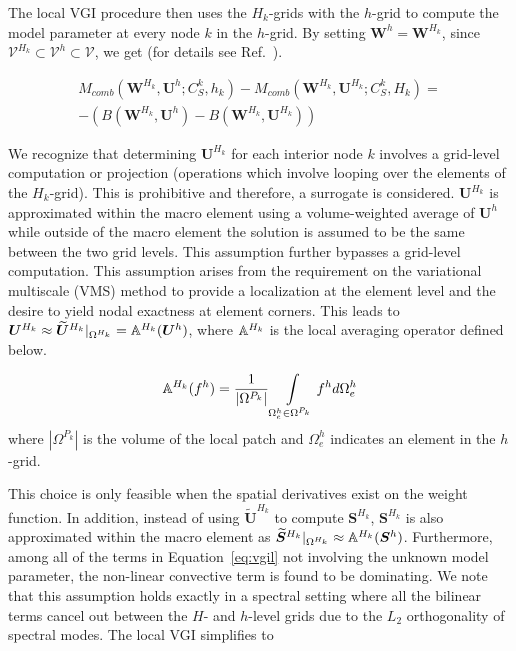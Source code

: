 The local VGI procedure then uses the
$H_k$-grids with the $h$-grid to compute the model
parameter at every node $k$ in the $h$-grid.
By setting $\bm{W}^h = \bm{W}^{H_k}$,
since $\bm{\mathcal{V}}^{H_k} \subset \bm{\mathcal{V}}^h \subset \bm{\mathcal{V}}$,
we get (for details see Ref.~\cite{bib:tran2017b}).

\begin{equation}
\label{eq:vgil}
\begin{split}
 M_{comb}(\bm{W}^{H_k},\bm{U}^h; C^k_S, h_k) - M_{comb}(\bm{W}^{H_k},\bm{U}^{H_k}; C^k_S, {H_k})  = \\
  -(B(\bm{W}^{H_k},\bm{U}^h)- B(\bm{W}^{H_k},\bm{U}^{H_k}))
\end{split}
\end{equation}

We recognize that determining $\bm{U}^{H_k}$ for each interior node $k$ involves a grid-level
computation or projection (operations which involve looping over the elements of the $H_k$-grid). This is prohibitive and therefore, a surrogate is considered.
$\bm{U}^{H_k}$ is approximated within the macro element
using a volume-weighted average of $\bm{U}^h$ while outside
of the macro element the solution is assumed to be the same between the two grid levels.
This assumption further bypasses a grid-level computation. This assumption arises from the requirement on the variational multiscale (VMS) method to provide a localization at the element level and the desire to yield nodal exactness at element corners\cite{bib:hughes3}.
This leads to
$\bm{U}^{H_k} \approx \widetilde{\bm{U}}^{H_k}|_{\Omega^{H_k}} = \mathbb{A}^{H_k}(\bm{U}^h)$, where
$\mathbb{A}^{H_k}$ is the local averaging operator defined below.

\begin{equation}
\label{eq:avg}
\mathbb{A}^{H_k} (f^h) = \frac{1}{|\Omega^{P_k}|}\int\limits_{\Omega^h_e\in\Omega^{P_k}} f^h d\Omega^h_e
\end{equation}
\noindent where $|\Omega^{P_k}|$ is the volume of the local patch
and $\Omega^h_e$ indicates an element in the $h$-grid.

This choice is only feasible when the spatial derivatives exist on the weight function.
In addition, instead of using $\widetilde{\bm{U}}^{H_k}$ to compute $\bm{S}^{H_k}$, $\bm{S}^{H_k}$ is also approximated within the macro element as $\widetilde{\bm{S}}^{H_k}|_{\Omega^{H_k}} \approx \mathbb{A}^{H_k}(\bm{S}^h)$.
Furthermore, among all of the terms in Equation~\eqref{eq:vgil} 
not involving the unknown model parameter, the non-linear convective 
term is found to be dominating\cite{bib:tran2017b}. We note that this assumption holds 
exactly in a spectral setting where all the bilinear terms cancel out 
between the $H$- and $h$-level grids due to the $L_2$ orthogonality of 
spectral modes\cite{bib:oberai2005_2}. 
The local VGI simplifies to

